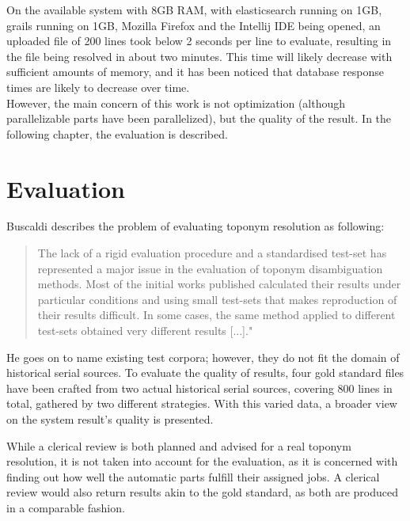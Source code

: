 \documentclass[11pt]{article}
\begin{document}
On the available system with 8GB RAM, with elasticsearch running on 1GB, grails running on 1GB, Mozilla Firefox and the Intellij IDE being opened, an uploaded file of 200 lines took below 2 seconds per line to evaluate, resulting in the file being resolved in about two minutes. This time will likely decrease with sufficient amounts of memory, and it has been noticed that database response times are likely to decrease over time.\\

However, the main concern of this work is not optimization (although parallelizable parts have been parallelized), but the quality of the result. In the following chapter, the evaluation is described.

\newpage
\section{Evaluation}
Buscaldi describes the problem of evaluating toponym resolution as following:

\begin{quote}
The lack of a rigid evaluation procedure and a standardised test-set has represented a major issue in the evaluation of toponym disambiguation methods. Most of the initial works published calculated their results under particular conditions and using small test-sets that makes reproduction of their results difficult. In some cases, the same method applied to different test-sets obtained very different results [...]." \cite{buscaldi11}
\end{quote}

He goes on to name existing test corpora; however, they do not fit the domain of historical serial sources. To evaluate the quality of results, four gold standard files have been crafted from two actual historical serial sources, covering 800 lines in total, gathered by two different strategies. With this varied data, a broader view on the system result's quality is presented.

While a clerical review is both planned and advised for a real toponym resolution, it is not taken into account for the evaluation, as it is concerned with finding out how well the automatic parts fulfill their assigned jobs. A clerical review would also return results akin to the gold standard, as both are produced in a comparable fashion.
\end{document}
